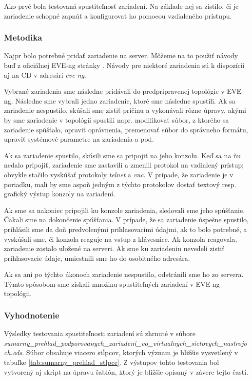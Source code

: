Ako prvé bola testovaná spustiteľnosť zariadení. Na základe nej sa zistilo, či je zariadenie schopné zapnúť a konfigurovať ho pomocou vzdialeného prístupu.



\subsubsection{Metodika}

Najpr bolo potrebné pridať zariadenie na server. Môžeme na to použiť návody buď z oficiálnej EVE-ng stránky \cite{eve_ng_howtos}. Návody pre niektoré zariadenia sú k dispozícii aj na CD v adresári \emph{eve-ng}.

Vybrané zariadenia sme následne pridávali do predpripravenej topológie v EVE-ng. Následne sme vybrali jedno zariadenie, ktoré sme následne spustili. Ak sa zariadenie nespustilo, skúšali sme zistiť príčinu a vykonávali rôzne úpravy, akými by sme zariadenie v topológii spustili napr. modifikovať súbor, z ktorého sa zariadenie spúšťalo, opraviť oprávnenia, premenovať súbor do správneho formátu, upraviť systémové parametre na zariadenia a pod.

Ak sa zariadenie spustilo, skúsili sme sa pripojiť na jeho konzolu. Keď sa na ňu nedalo pripojiť, zariadenie sme zastavili a zmenili protokol na vzdialený prístup; obvykle stačilo vyskúšať protokoly \emph{telnet} a \emph{vnc}. V prípade, že zariadenie je v poriadku, mali by sme aspoň jedným z týchto protokolov dostať textový resp. grafický výstup konzoly na zariadení.

Ak sme sa nakoniec pripojili ku konzole zariadenia, sledovali sme jeho spúšťanie. Čakali sme na dokončenie spúšťania. V prípade, že sa zariadenie úspešne spustilo, prihlásili sme da doň predvolenými prihlasovacími údajmi, ak to bolo potrebné, a vyskúšali sme, či konzola reaguje na vstup z klávesnice. Ak konzola reagovala, zariadenie zostalo uložené na serveri. Ak sme ku zariadeniu nevedeli zistiť prihlasovacie údaje, umiestnili sme ho do osobitného adresára.

Ak sa ani po týchto úkonoch zariadenie nespustilo, odstránili sme ho zo servera. Týmto spôsobom sme získali množinu spustiteľných zariadení v EVE-ng topológii.

\subsubsection{Vyhodnotenie}

Výsledky testovania spustiteľnosti zariadení sú zhrnuté v súbore \\ \emph{sumarny\_prehlad\_podporovanych\_zariadeni\_vo\_virtualnych\_sietovych\_nastrojoch.ods}. Súbor obsahuje viacero stĺpcov, ktorých význam je bližšie vysvetlený v tabuľke \ref{tab:sumarny_prehlad_stlpce}. Z výstupov tohto testovania bol vytvorený aj skript na úpravu šablón, ktorý je bližšie opísaný v závere tejto časti.

